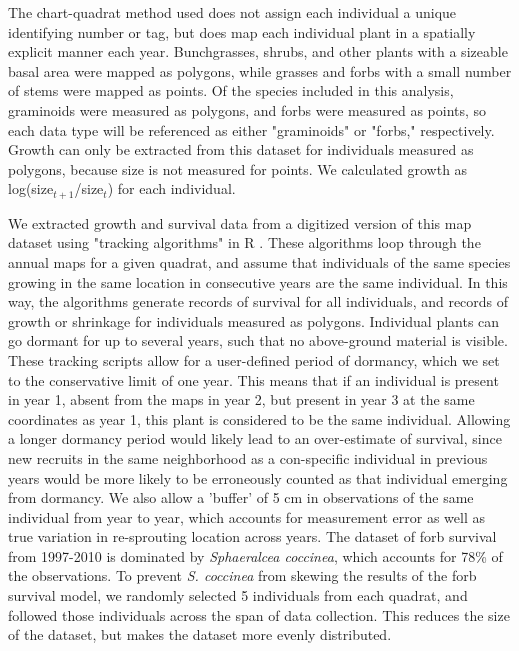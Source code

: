 \documentclass[12pt, letterpaper]{article}
\begin{document}
The chart-quadrat method used does not assign each individual a unique identifying number or tag, but does map each individual plant in a spatially explicit manner each year. Bunchgrasses, shrubs, and other plants with a sizeable basal area were mapped as polygons, while grasses and forbs with a small number of stems were mapped as points. Of the species included in this analysis, graminoids were measured as polygons, and forbs were measured as points, so each data type will be referenced as either "graminoids" or "forbs," respectively.  Growth can only be extracted from this dataset for individuals measured as polygons, because size is not measured for points. We calculated growth as log(size$_{t+1}$/size$_t$) for each individual.  

We extracted growth and survival data from a digitized version of this map dataset using "tracking algorithms" in R \citep{Lauenroth2008, RCoreTeam2019}. These algorithms loop through the annual maps for a given quadrat, and assume that individuals of the same species growing in the same location in consecutive years are the same individual. In this way, the algorithms generate records of survival for all individuals, and records of growth or shrinkage for individuals measured as polygons. Individual plants can go dormant for up to several years, such that no above-ground material is visible. These tracking scripts allow for a user-defined period of dormancy, which we set to the conservative limit of one year. This means that if an individual is present in year 1, absent from the maps in year 2, but present in year 3 at the same coordinates as year 1, this plant is considered to be the same individual. Allowing a longer dormancy period would likely lead to an over-estimate of survival, since new recruits in the same neighborhood as a con-specific individual in previous years would be more likely to be erroneously counted as that individual emerging from dormancy. We also allow a 'buffer' of 5 cm in observations of the same individual from year to year, which accounts for measurement error as well as true variation in re-sprouting location across years. 
The dataset of forb survival from 1997-2010 is dominated by \textit{Sphaeralcea coccinea}, which accounts for 78\% of the observations. To prevent \textit{S. coccinea} from skewing the results of the forb survival model, we randomly selected 5 individuals from each quadrat, and followed those individuals across the span of data collection. This reduces the size of the dataset, but makes the dataset more evenly distributed.
\end{document}
